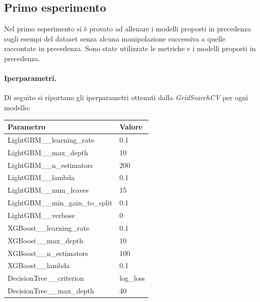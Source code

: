 \subsection{Primo esperimento}
\noindent Nel primo esperimento si è provato ad allenare i modelli proposti in precedenza sugli esempi del dataset senza alcuna manipolazione successiva a quelle raccontate in precedenza. Sono state utilizzate le metriche e i modelli proposti in precedenza.

\paragraph{Iperparametri.} Di seguito si riportano gli iperparametri ottenuti dalla \textit{GridSearchCV} per ogni modello:
    
        
        \begin{table}[H]
            \centering
            \begin{tabular}{|l|l|}
            \hline
            \textbf{Parametro}                 & \textbf{Valore} \\ \hline
            LightGBM\_\_learning\_rate            & 0.1             \\ \hline
            LightGBM\_\_max\_depth                & 10              \\ \hline
            LightGBM\_\_n\_estimators             & 200             \\ \hline
            LightGBM\_\_lambda                    & 0.1             \\ \hline
            LightGBM\_\_num\_leaves               & 15              \\ \hline
            LightGBM\_\_min\_gain\_to\_split      & 0.1             \\ \hline
            LightGBM\_\_verbose                   & 0               \\ \hline
            XGBoost\_\_learning\_rate         & 0.1             \\ \hline
            XGBoost\_\_max\_depth             & 10              \\ \hline
            XGBoost\_\_n\_estimators          & 100             \\ \hline
            XGBoost\_\_lambda                 & 0.1             \\ \hline
            DecisionTree\_\_criterion         & log\_loss       \\ \hline
            DecisionTree\_\_max\_depth        & 40              \\ \hline

\end{tabular}
\end{table}
